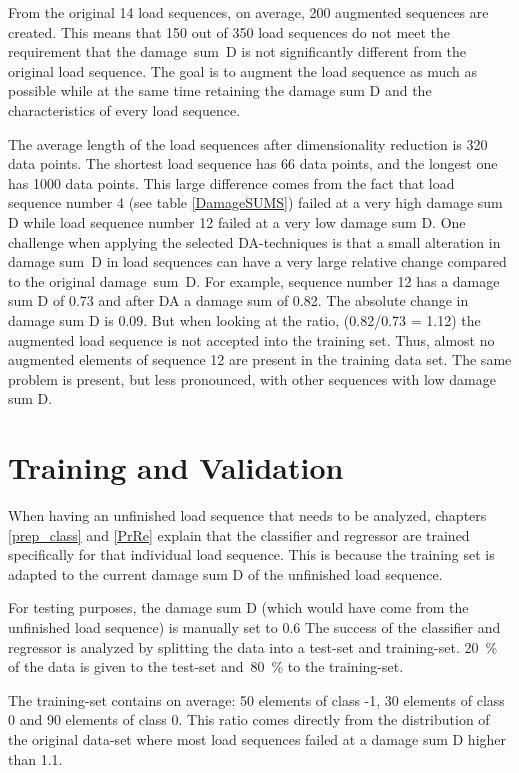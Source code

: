 From the original 14 load sequences, on average, 200 augmented sequences are created. This means that 150 out of 350 load sequences do not meet the requirement that the damage~sum~D is not significantly different from the original load sequence. 
The goal is to augment the load sequence as much as possible while at the same time retaining the damage sum D and the characteristics of every load sequence. 


The average length of the load sequences after dimensionality reduction is 320 data points. The shortest load sequence has 66 data points, and the longest one has 1000 data points. This large difference comes from the fact that load sequence number 4 (see table \ref{DamageSUMS}) failed at a very high damage sum D while load sequence number 12 failed at a very low damage sum D.
\newpage
One challenge when applying the selected DA-techniques is that a small alteration in damage sum~D in load sequences can have a very large relative change compared to the original damage~sum~D. For example, sequence number 12 has a damage sum D of 0.73 and after DA a damage sum of 0.82. The absolute change in damage sum D is 0.09. But when looking at the ratio, (0.82/0.73 = 1.12) the augmented load sequence is not accepted into the training set. Thus, almost no augmented elements of sequence 12 are present in the training data set. The same problem is present, but less pronounced, with other sequences with low damage sum D.



\section{Training and Validation}
When having an unfinished load sequence that needs to be analyzed, chapters \ref{prep_class} and \ref{PrRe} explain that the classifier and regressor are trained specifically for that individual load sequence. This is because the training set is adapted to the current damage sum D of the unfinished load sequence.

For testing purposes, the damage sum D (which would have come from the unfinished load sequence) is manually set to 0.6
The success of the classifier and regressor is analyzed by splitting the data into a test-set and training-set. 
20~\% of the data is given to the test-set and~80~\% to the training-set.

The training-set contains on average: 50 elements of class -1, 30 elements of class 0 and 90 elements of class 0. This ratio comes directly from the distribution of the original data-set where most load sequences failed at a damage sum D higher than 1.1.

